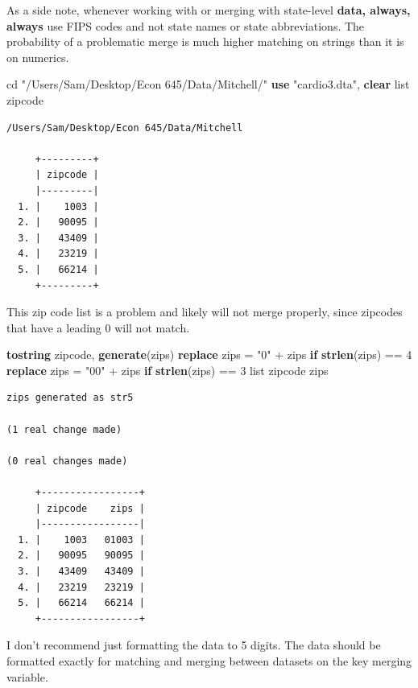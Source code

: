 \documentclass[
]{book}
\newenvironment{Shaded}{\begin{snugshade}}{\end{snugshade}}
\newcommand{\FunctionTok}[1]{\textcolor[rgb]{0.13,0.29,0.53}{\textbf{#1}}}
\newcommand{\KeywordTok}[1]{\textcolor[rgb]{0.13,0.29,0.53}{\textbf{#1}}}
\newcommand{\NormalTok}[1]{#1}
\newcommand{\OtherTok}[1]{\textcolor[rgb]{0.56,0.35,0.01}{#1}}
\newcommand{\StringTok}[1]{\textcolor[rgb]{0.31,0.60,0.02}{#1}}
\begin{document}
As a side note, whenever working with or merging with state-level \textbf{data, always, always} use FIPS codes and not state names or state abbreviations. The probability of a problematic merge is much higher matching on strings than it is on numerics.

\begin{Shaded}
\begin{Highlighting}[]
\NormalTok{cd }\StringTok{"/Users/Sam/Desktop/Econ 645/Data/Mitchell/"}
\KeywordTok{use} \StringTok{"cardio3.dta"}\NormalTok{, }\KeywordTok{clear}
\OtherTok{list}\NormalTok{ zipcode}
\end{Highlighting}
\end{Shaded}

\begin{verbatim}
/Users/Sam/Desktop/Econ 645/Data/Mitchell

     +---------+
     | zipcode |
     |---------|
  1. |    1003 |
  2. |   90095 |
  3. |   43409 |
  4. |   23219 |
  5. |   66214 |
     +---------+
\end{verbatim}

This zip code list is a problem and likely will not merge properly, since zipcodes that have a leading 0 will not match.

\begin{Shaded}
\begin{Highlighting}[]
\KeywordTok{tostring}\NormalTok{ zipcode, }\KeywordTok{generate}\NormalTok{(zips)}
\KeywordTok{replace}\NormalTok{ zips = }\StringTok{"0"}\NormalTok{ + zips }\KeywordTok{if} \FunctionTok{strlen}\NormalTok{(zips) == 4}
\KeywordTok{replace}\NormalTok{ zips = }\StringTok{"00"}\NormalTok{ + zips }\KeywordTok{if} \FunctionTok{strlen}\NormalTok{(zips) == 3}
\OtherTok{list}\NormalTok{ zipcode zips}
\end{Highlighting}
\end{Shaded}

\begin{verbatim}
zips generated as str5

(1 real change made)

(0 real changes made)

     +-----------------+
     | zipcode    zips |
     |-----------------|
  1. |    1003   01003 |
  2. |   90095   90095 |
  3. |   43409   43409 |
  4. |   23219   23219 |
  5. |   66214   66214 |
     +-----------------+
\end{verbatim}

I don't recommend just formatting the data to 5 digits. The data should be formatted exactly for matching and merging between datasets on the key merging variable.
\end{document}
